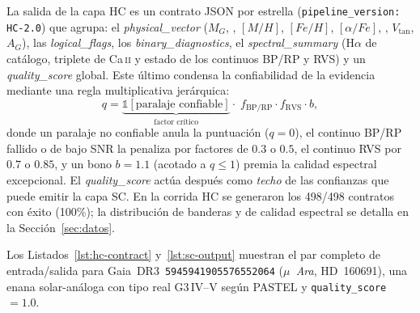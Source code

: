 La salida de la capa HC es un contrato JSON por estrella
(\texttt{pipeline\_version: HC-2.0}) que agrupa: el \emph{physical\_vector}
($M_G$, \teff{}, $[M/H]$, $[Fe/H]$, $[\alpha/Fe]$, \logg{}, $V_\mathrm{tan}$,
$A_G$), las \emph{logical\_flags}, los \emph{binary\_diagnostics}, el
\emph{spectral\_summary} (H$\alpha$ de catálogo, triplete de Ca\,\textsc{ii} y
estado de los continuos BP/RP y RVS) y un \emph{quality\_score} global. Este último
condensa la confiabilidad de la evidencia mediante una regla multiplicativa
jerárquica:
\begin{equation}
  q =
  \underbrace{\mathbb{1}[\text{paralaje confiable}]}_{\text{factor crítico}}
  \cdot\; f_\mathrm{BP/RP} \cdot f_\mathrm{RVS} \cdot b,
  \label{eq:quality}
\end{equation}
donde un paralaje no confiable anula la puntuación ($q=0$), el continuo BP/RP
fallido o de bajo SNR la penaliza por factores de $0.3$ o $0.5$, el continuo RVS
por $0.7$ o $0.85$, y un bono $b=1.1$ (acotado a $q\le1$) premia la calidad
espectral excepcional. El \emph{quality\_score} actúa después como \emph{techo} de
las confianzas que puede emitir la capa SC. En la corrida HC se generaron los
\num{498}/\num{498} contratos con éxito (100\%); la distribución de banderas y de
calidad espectral se detalla en la Sección~\ref{sec:datos}.

Los Listados~\ref{lst:hc-contract} y~\ref{lst:sc-output} muestran el par
completo de entrada/salida para Gaia~DR3~\texttt{5945941905576552064}
(\emph{$\mu$~Ara}, HD~160691), una enana solar-análoga con tipo real G3\,IV--V
según PASTEL y \texttt{quality\_score}~$=1.0$.

